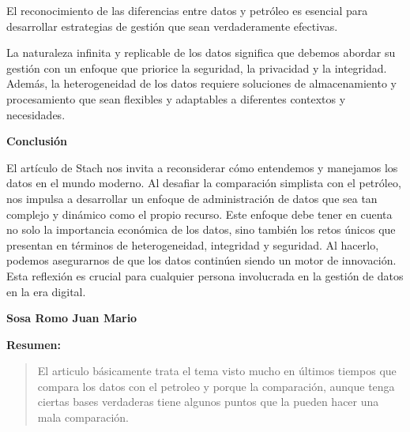 El reconocimiento de las diferencias entre datos y petróleo es esencial para desarrollar estrategias de gestión que sean verdaderamente efectivas.

La naturaleza infinita y replicable de los datos significa que debemos abordar su gestión con un enfoque que priorice la seguridad, la privacidad y la integridad. Además, la heterogeneidad de los datos requiere soluciones de almacenamiento y procesamiento que sean flexibles y adaptables a diferentes contextos y necesidades.

\textbf{Conclusión}

El artículo de Stach nos invita a reconsiderar cómo entendemos y manejamos los datos en el mundo moderno. Al desafiar la comparación simplista con el petróleo, nos impulsa a desarrollar un enfoque de administración de datos que sea tan complejo y dinámico como el propio recurso. Este enfoque debe tener en cuenta no solo la importancia económica de los datos, sino también los retos únicos que presentan en términos de heterogeneidad, integridad y seguridad. Al hacerlo, podemos asegurarnos de que los datos continúen siendo un motor de innovación. Esta reflexión es crucial para cualquier persona involucrada en la gestión de datos en la era digital.

\begin{center}
    \textbf{Sosa Romo Juan Mario}
\end{center}

\textbf{Resumen:}
\begin{quote}
    El articulo básicamente trata el tema visto mucho en últimos tiempos que compara los datos con el petroleo y porque la comparación, aunque tenga ciertas bases verdaderas tiene algunos puntos que la pueden hacer una mala comparación.
\end{quote}

